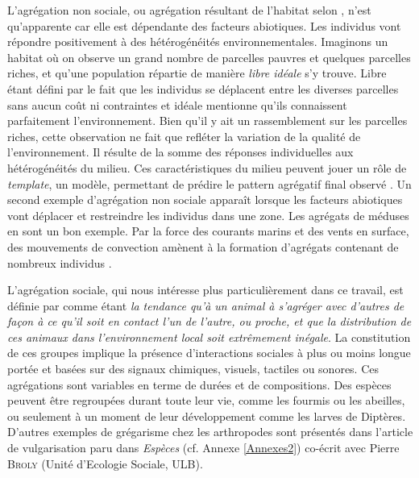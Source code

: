 L'agrégation non sociale, ou agrégation résultant de l'habitat selon \citet{danchin_evolution_1997}, n'est qu'apparente car elle est dépendante des facteurs abiotiques. Les individus vont répondre positivement à des hétérogénéités environnementales. Imaginons un habitat où on observe un grand nombre de parcelles pauvres et quelques parcelles riches, et qu'une population répartie de manière \textit{libre idéale} s'y trouve. Libre étant défini par le fait que les individus se déplacent entre les diverses parcelles sans aucun coût ni contraintes et idéale mentionne qu'ils connaissent parfaitement l'environnement. Bien qu'il y ait un rassemblement sur les parcelles riches, cette observation ne fait que refléter la variation de la qualité de l'environnement. Il résulte de la somme des réponses individuelles aux hétérogénéités du milieu. Ces caractéristiques du milieu peuvent jouer un rôle de \textit{template}, un modèle, permettant de prédire le pattern agrégatif final observé \cite{camazine_self-organization_2001}.
Un second exemple d'agrégation non sociale apparaît lorsque les facteurs abiotiques vont déplacer et restreindre les individus dans une zone. Les agrégats de méduses en sont un bon exemple. Par la force des courants marins et des vents en surface, des mouvements de convection amènent à la formation d'agrégats contenant de nombreux individus \cite{hamner_regularly_1986}. 

L'agrégation sociale, qui nous intéresse plus particulièrement dans ce travail, est définie par \citet{vulinec_collective_1990} comme étant \textit{la tendance qu'à un animal à s'agréger avec d'autres de façon à ce qu'il soit en contact l'un de l'autre, ou proche, et que la distribution de ces animaux dans l'environnement local soit extrêmement inégale}\footnotemark[1]. La constitution de ces groupes implique la présence d'interactions sociales \cite{parrish_animal_1997} à plus ou moins longue portée et basées sur des signaux chimiques, visuels, tactiles ou sonores. Ces agrégations sont variables en terme de durées et de compositions. Des espèces peuvent être regroupées durant toute leur vie, comme les fourmis ou les abeilles, ou seulement à un moment de leur développement comme les larves de Diptères. D'autres exemples de grégarisme chez les arthropodes sont présentés dans l'article de vulgarisation paru dans \textit{Espèces} (cf. Annexe \ref{Annexes2}) co-écrit avec Pierre \textsc{Broly} (Unité d'Ecologie Sociale, ULB).


